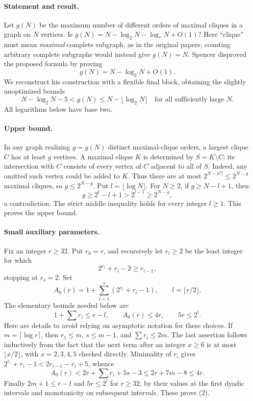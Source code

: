 \paragraph{Statement and result.}
Let \(g(N)\) be the maximum number of different orders of maximal cliques in a graph on \(N\) vertices. Is
\(g(N)=N-\log_2N-\log_*N+O(1)\)? Here ``clique'' must mean \emph{maximal} complete subgraph, as in the original papers; counting arbitrary complete subgraphs would instead give \(g(N)=N\). Spencer disproved the proposed formula by proving
\[
 g(N)=N-\log_2N+O(1).
\]
We reconstruct his construction with a flexible final block, obtaining the slightly unoptimized bounds
\[
 N-\log_2N-5<g(N)\leq N-\lfloor\log_2N\rfloor
 \quad\text{for all sufficiently large }N. \tag{1}
\]
All logarithms below have base two.

\paragraph{Upper bound.}
In any graph realizing \(g=g(N)\) distinct maximal-clique orders, a largest clique \(C\) has at least \(g\) vertices. A maximal clique \(K\) is determined by \(S=K\setminus C\): its intersection with \(C\) consists of every vertex of \(C\) adjacent to all of \(S\). Indeed, any omitted such vertex could be added to \(K\). Thus there are at most \(2^{N-|C|}\leq2^{N-g}\) maximal cliques, so
\(g\leq2^{N-g}\). Put \(l=\lfloor\log N\rfloor\). For \(N\geq2\), if \(g\geq N-l+1\), then
\[
 g\geq2^l-l+1>2^{l-1}\geq2^{N-g},
\]
a contradiction. The strict middle inequality holds for every integer \(l\geq1\). This proves the upper bound.

\paragraph{Small auxiliary parameters.}
Fix an integer \(r\geq32\). Put \(r_0=r\), and recursively let \(r_i\geq2\) be the least integer for which
\[
 2^{r_i}+r_i-2\geq r_{i-1},
\]
stopping at \(r_s=2\). Set
\[
 A_0(r)=1+\sum_{i=1}^s(2^{r_i}+r_i-1),\qquad
 l=\lfloor r/2\rfloor.
\]
The elementary bounds needed below are
\[
 1+\sum r_i\leq r-l,\qquad A_0(r)\leq4r,
 \qquad 5r\leq2^l. \tag{2}
\]
Here are details to avoid relying on asymptotic notation for these choices. If \(m=\lceil\log r\rceil\), then \(r_1\leq m\), \(s\leq m-1\), and \(\sum r_i\leq2m\). The last assertion follows inductively from the fact that the next term after an integer \(x\geq6\) is at most \(\lfloor x/2\rfloor\), with \(x=2,3,4,5\) checked directly. Minimality of \(r_i\) gives
\(2^{r_i}+r_i-1<2r_{i-1}-r_i+5\), whence
\[
 A_0(r)<2r+\sum r_i+5s-3\leq2r+7m-8\leq4r.
\]
Finally \(2m+1\leq r-l\) and \(5r\leq2^l\) for \(r\geq32\), by their values at the first dyadic intervals and monotonicity on subsequent intervals. These prove (2).

